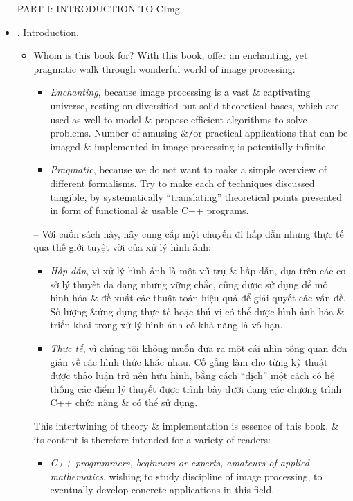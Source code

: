 \documentclass{article}
\begin{document}
\begin{itemize}
    PART I: INTRODUCTION TO CImg.
    \item {. Introduction.}
    \begin{itemize}
        \item {\sf Whom is this book for?} With this book, offer an enchanting, yet pragmatic walk through wonderful world of image processing:
        \begin{itemize}
            \item {\it Enchanting}, because image processing is a vast \& captivating universe, resting on diversified but solid theoretical bases, which are used as well to model \& propose efficient algorithms to solve problems. Number of amusing \&{\tt/}or practical applications that can be imaged \& implemented in image processing is potentially infinite.
            \item {\it Pragmatic}, because we do not want to make a simple overview of different formalisms. Try to make each of techniques discussed tangible, by systematically ``translating'' theoretical points presented in form of functional \& usable C++ programs.
        \end{itemize}
        -- Với cuốn sách này, hãy cung cấp một chuyến đi hấp dẫn nhưng thực tế qua thế giới tuyệt vời của xử lý hình ảnh:
        \begin{itemize}
            \item {\it Hấp dẫn}, vì xử lý hình ảnh là một vũ trụ \& hấp dẫn, dựa trên các cơ sở lý thuyết đa dạng nhưng vững chắc, cũng được sử dụng để mô hình hóa \& đề xuất các thuật toán hiệu quả để giải quyết các vấn đề. Số lượng \&{\tt}ứng dụng thực tế hoặc thú vị có thể được hình ảnh hóa \& triển khai trong xử lý hình ảnh có khả năng là vô hạn.
            \item {\it Thực tế}, vì chúng tôi không muốn đưa ra một cái nhìn tổng quan đơn giản về các hình thức khác nhau. Cố gắng làm cho từng kỹ thuật được thảo luận trở nên hữu hình, bằng cách ``dịch'' một cách có hệ thống các điểm lý thuyết được trình bày dưới dạng các chương trình C++ chức năng \& có thể sử dụng.
        \end{itemize}
        This intertwining of theory \& implementation is essence of this book, \& its content is therefore intended for a variety of readers:
        \begin{itemize}
            \item {\it C++ programmers, beginners or experts, amateurs of applied mathematics}, wishing to study discipline of image processing, to eventually develop concrete applications in this field.

\end{itemize}
\end{itemize}
\end{itemize}
\end{document}
